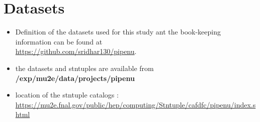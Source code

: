 \appendix

\section {Datasets}
\label{appendix_b}

{\red 
\begin{itemize}
\item 
  Definition of the datasets used for this study ant the book-keeping information
  can be found at \\
  \href{https://github.com/sridhar130/pipenu}{https://github.com/sridhar130/pipenu}.
\item
  the datasets and stntuples are available from {\bf /exp/mu2e/data/projects/pipenu}
\item
  location of the stntuple catalogs : \\
  \href{https://mu2e.fnal.gov/public/hep/computing/Stntuple/cafdfc/pipenu/index.shtml}
  {https://mu2e.fnal.gov/public/hep/computing/Stntuple/cafdfc/pipenu/index.shtml}
\end{itemize}
}

